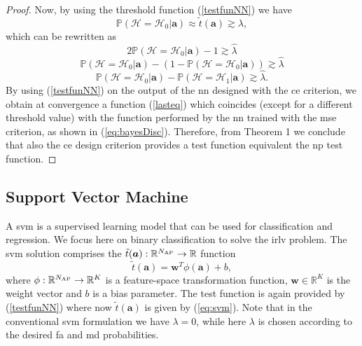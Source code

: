 \documentclass[draftcls,onecolumn,12pt]{IEEEtran}
\begin{document}
{\begin{proof}
Now, by using the threshold function (\ref{testfunNN}) we have 
\begin{equation}
    \mathbb{P}(\mathcal{H}=\mathcal{H}_0|\bm{a}) \approx  \tilde{t}(\bm{a}) \gtrsim \lambda,
\end{equation}
which can be rewritten as
\begin{equation}
    2\mathbb{P}(\mathcal{H}=\mathcal{H}_0|\bm{a} )-1 \gtrsim \hat{\lambda}
\end{equation}
\begin{equation}
    \mathbb{P}(\mathcal{H}=\mathcal{H}_0|\bm{a} )-(1-\mathbb{P}(\mathcal{H}=\mathcal{H}_0|\bm{a} )) \gtrsim \hat{\lambda}
\end{equation}
\begin{equation}
\label{lasteq}
    \mathbb{P}(\mathcal{H}=\mathcal{H}_0|\bm{a} )-\mathbb{P}(\mathcal{H}=\mathcal{H}_1|\bm{a} ) \gtrsim \hat{\lambda}.
\end{equation}
By using (\ref{testfunNN}) on the output of the \ac{nn} designed with the \ac{ce} criterion, we obtain at convergence a function (\ref{lasteq}) which coincides (except for a different threshold value) with the function performed by the \ac{nn} trained with the \ac{mse} criterion, as shown in (\ref{eq:bayesDisc}). Therefore, from Theorem 1 we conclude that also the \ac{ce} design criterion provides a test function equivalent the \ac{np} test function.
\end{proof}

\subsection{Support Vector Machine}\label{sec:svm}
A \ac{svm} \underline{\cite[Chapter~7]{Bishop2006}} is a supervised learning model that can be used for classification and regression. We focus here on binary classification to solve the \ac{irlv} problem. The \ac{svm} solution comprises the $\tilde{t}(\bm{a}): \mathbb{R}^{N_{\rm AP}} \to \mathbb{R}$  function 
\begin{equation}
\label{eq:svm}
\tilde{t}(\bm{a}) = \bm{w}^T \phi (\bm{a}) + b,
\end{equation}
where $\phi: \mathbb{R}^{N_{\rm AP}} \to \mathbb{R}^K$ is a feature-space transformation function, $\bm{w} \in \mathbb{R}^K$ is the weight vector and $b$ is a bias parameter. The test function is again provided by (\ref{testfunNN}) where now $\tilde{t}(\bm{a})$ is given by (\ref{eq:svm}). Note that in the conventional \ac{svm} formulation we have $\lambda = 0$, while here $\lambda$ is chosen according to the desired \ac{fa} and \ac{md} probabilities.

}
\end{document}
